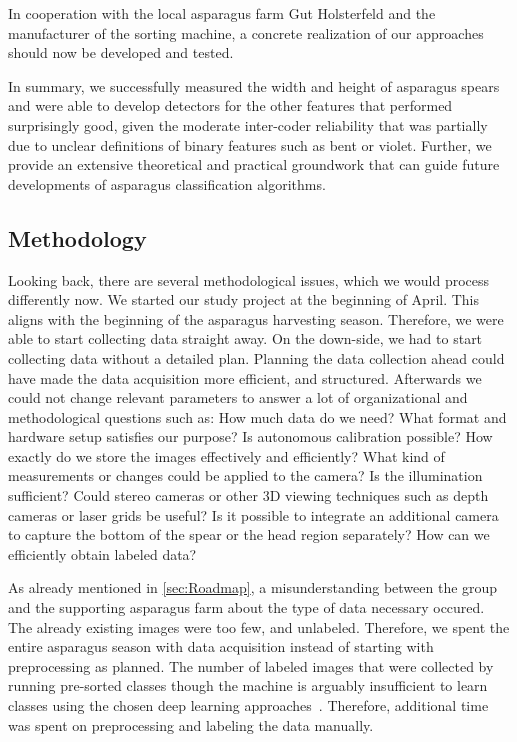 In cooperation with the local asparagus farm Gut Holsterfeld and the manufacturer of the sorting machine, a concrete realization of our approaches should now be developed and tested.

\bigskip
In summary, we successfully measured the width and height of asparagus spears and were able to develop detectors for the other features that performed surprisingly good, given the moderate inter-coder reliability that was partially due to unclear definitions of binary features such as bent or violet. Further, we provide an extensive theoretical and practical groundwork that can guide future developments of asparagus classification algorithms.


\subsection{Methodology}
\label{sec:DiscussionMethodology}

Looking back, there are several methodological issues, which we would process differently now. We started our study project at the beginning of April. This aligns with the beginning of the asparagus harvesting season. Therefore, we were able to start collecting data straight away. On the down-side, we had to start collecting data without a detailed plan. Planning the data collection ahead could have made the data acquisition more efficient, and structured. Afterwards we could not change relevant parameters to answer a lot of organizational and methodological questions such as: How much data do we need? What format and hardware setup satisfies our purpose? Is autonomous calibration possible? How exactly do we store the images effectively and efficiently? What kind of measurements or changes could be applied to the camera? Is the illumination sufficient? Could stereo cameras or other 3D viewing techniques such as depth cameras or laser grids be useful? Is it possible to integrate an additional camera to capture the bottom of the spear or the head region separately? How can we efficiently obtain labeled data?

\bigskip
As already mentioned in \autoref{sec:Roadmap}, a misunderstanding between the group and the supporting asparagus farm about the type of data necessary occured. The already existing images were too few, and unlabeled. Therefore, we spent the entire asparagus season with data acquisition instead of starting with preprocessing as planned. The number of labeled images that were collected by running pre-sorted classes though the machine is arguably insufficient to learn classes using the chosen deep learning approaches~\citep{russakovsky2013detecting,russakovsky2010attribute,how_many_images}. Therefore, additional time was spent on preprocessing and labeling the data manually.

